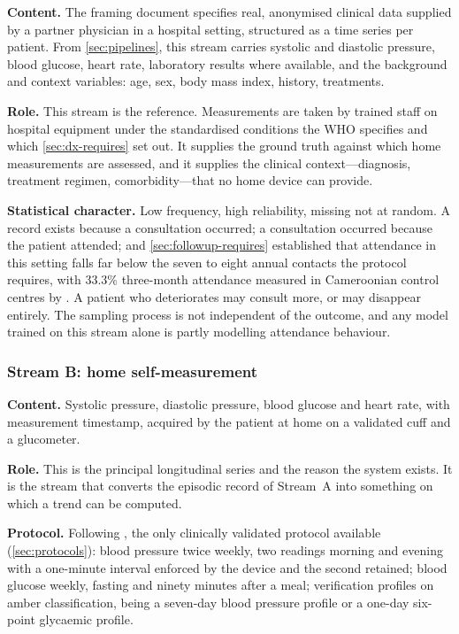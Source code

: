 \documentclass[12pt,a4paper,oneside]{report}
\begin{document}
\textbf{Content.} The framing document specifies real, anonymised clinical data supplied by a partner physician in a hospital setting, structured as a time series per patient. From \cref{sec:pipelines}, this stream carries systolic and diastolic pressure, blood glucose, heart rate, laboratory results where available, and the background and context variables: age, sex, body mass index, history, treatments.

\textbf{Role.} This stream is the reference. Measurements are taken by trained staff on hospital equipment under the standardised conditions the WHO specifies and which \cref{sec:dx-requires} set out. It supplies the ground truth against which home measurements are assessed, and it supplies the clinical context---diagnosis, treatment regimen, comorbidity---that no home device can provide.

\textbf{Statistical character.} Low frequency, high reliability, missing not at random. A record exists because a consultation occurred; a consultation occurred because the patient attended; and \cref{sec:followup-requires} established that attendance in this setting falls far below the seven to eight annual contacts the protocol requires, with 33.3\% three-month attendance measured in Cameroonian control centres by \textcite{bediang2021}. A patient who deteriorates may consult more, or may disappear entirely. The sampling process is not independent of the outcome, and any model trained on this stream alone is partly modelling attendance behaviour.

\subsubsection{Stream B: home self-measurement}

\textbf{Content.} Systolic pressure, diastolic pressure, blood glucose and heart rate, with measurement timestamp, acquired by the patient at home on a validated cuff and a glucometer.

\textbf{Role.} This is the principal longitudinal series and the reason the system exists. It is the stream that converts the episodic record of Stream~A into something on which a trend can be computed.

\textbf{Protocol.} Following \textcite{mihevc2025}, the only clinically validated protocol available (\cref{sec:protocols}): blood pressure twice weekly, two readings morning and evening with a one-minute interval enforced by the device and the second retained; blood glucose weekly, fasting and ninety minutes after a meal; verification profiles on amber classification, being a seven-day blood pressure profile or a one-day six-point glycaemic profile.
\end{document}
